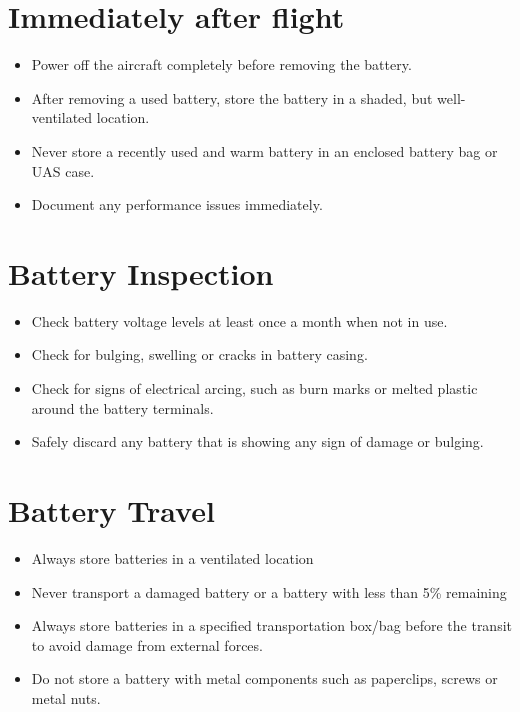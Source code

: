 \documentclass[
]{book}
\providecommand{\tightlist}{%
  \setlength{\itemsep}{0pt}\setlength{\parskip}{0pt}}
\begin{document}
\hypertarget{immediately-after-flight}{%
\section{Immediately after flight}\label{immediately-after-flight}}

\begin{itemize}
\tightlist
\item
  Power off the aircraft completely before removing the battery.
\item
  After removing a used battery, store the battery in a shaded, but well-ventilated location.\\
\item
  Never store a recently used and warm battery in an enclosed battery bag or UAS case.
\item
  Document any performance issues immediately.
\end{itemize}

\hypertarget{battery-inspection}{%
\section{Battery Inspection}\label{battery-inspection}}

\begin{itemize}
\tightlist
\item
  Check battery voltage levels at least once a month when not in use.
\item
  Check for bulging, swelling or cracks in battery casing.
\item
  Check for signs of electrical arcing, such as burn marks or melted plastic around the battery terminals.
\item
  Safely discard any battery that is showing any sign of damage or bulging.
\end{itemize}

\hypertarget{battery-travel}{%
\section{Battery Travel}\label{battery-travel}}

\begin{itemize}
\tightlist
\item
  Always store batteries in a ventilated location
\item
  Never transport a damaged battery or a battery with less than 5\% remaining
\item
  Always store batteries in a specified transportation box/bag before the transit to avoid damage from external forces.
\item
  Do not store a battery with metal components such as paperclips, screws or metal nuts.
\end{itemize}
\end{document}
